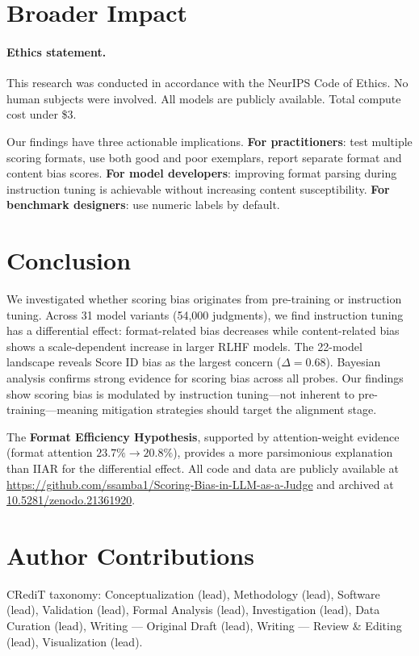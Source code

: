\documentclass[11pt,a4paper]{article}
\begin{document}
\section{Broader Impact}

\paragraph{Ethics statement.}
This research was conducted in accordance with the NeurIPS Code of Ethics. No human subjects were involved. All models are publicly available. Total compute cost under \$3.

Our findings have three actionable implications. \textbf{For practitioners}: test multiple scoring formats, use both good and poor exemplars, report separate format and content bias scores. \textbf{For model developers}: improving format parsing during instruction tuning is achievable without increasing content susceptibility. \textbf{For benchmark designers}: use numeric labels by default.

\section{Conclusion}

We investigated whether scoring bias originates from pre-training or instruction tuning. Across 31 model variants (54,000 judgments), we find instruction tuning has a differential effect: format-related bias decreases while content-related bias shows a scale-dependent increase in larger RLHF models. The 22-model landscape reveals Score ID bias as the largest concern ($\Delta=0.68$). Bayesian analysis confirms strong evidence for scoring bias across all probes. Our findings show scoring bias is modulated by instruction tuning---not inherent to pre-training---meaning mitigation strategies should target the alignment stage.

The \textbf{Format Efficiency Hypothesis}, supported by attention-weight evidence (format attention $23.7\%\to20.8\%$), provides a more parsimonious explanation than IIAR for the differential effect. All code and data are publicly available at \url{https://github.com/ssamba1/Scoring-Bias-in-LLM-as-a-Judge} and archived at \href{https://doi.org/10.5281/zenodo.21361920}{10.5281/zenodo.21361920}.

\section*{Author Contributions}
CRediT taxonomy: Conceptualization (lead), Methodology (lead), Software (lead), Validation (lead), Formal Analysis (lead), Investigation (lead), Data Curation (lead), Writing --- Original Draft (lead), Writing --- Review \& Editing (lead), Visualization (lead).
\end{document}
